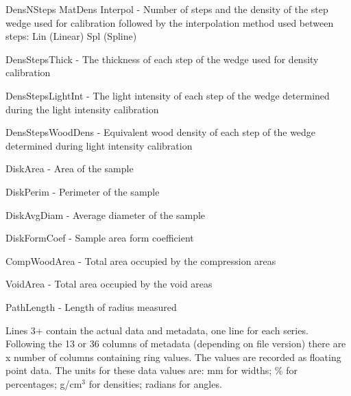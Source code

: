 \begin{itemize*}
DensNSteps MatDens Interpol - Number of steps and the density of the step wedge used for calibration followed by the interpolation method used between steps: Lin (Linear) Spl (Spline)
\item 

DensStepsThick - The thickness of each step of the wedge used for density calibration
\item 

DensStepsLightInt - The light intensity of each step of the wedge determined during the light intensity calibration
\item 

DensStepsWoodDens - Equivalent wood density of each step of the wedge determined during light intensity calibration
\item 

DiskArea - Area of the sample
\item 

DiskPerim - Perimeter of the sample
\item 

DiskAvgDiam - Average diameter of the sample
\item 

DiskFormCoef - Sample area form coefficient
\item 

CompWoodArea - Total area occupied by the compression areas
\item 

VoidArea - Total area occupied by the void areas
\item 

PathLength - Length of radius measured 
\end{itemize*}

Lines 3+ contain the actual data and metadata, one line for each series. Following the 13 or 36 columns of metadata (depending on file version) there are x number of columns containing ring values. The values are recorded as floating point data. The units for these data values are: mm for widths; \% for percentages; g/cm$^3$ for densities; radians for angles. 
